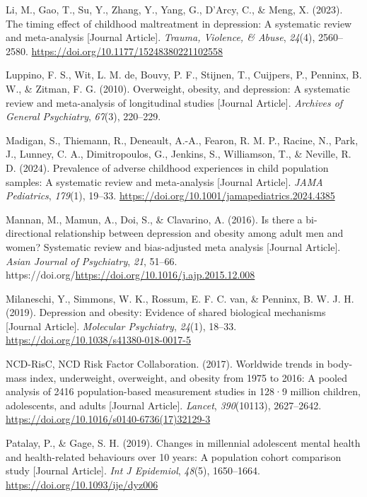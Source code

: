 \documentclass[
  letterpaper,
  DIV=11,
  numbers=noendperiod]{scrreport}
\newlength{\cslhangindent}
\newenvironment{CSLReferences}[2] %
 {\begin{list}{}{%
  \setlength{\itemindent}{0pt}
  \setlength{\leftmargin}{0pt}
  \setlength{\parsep}{0pt}
  \ifodd #1
   \setlength{\leftmargin}{\cslhangindent}
   \setlength{\itemindent}{-1\cslhangindent}
  \fi
  \setlength{\itemsep}{#2\baselineskip}}}
 {\end{list}}
\begin{document}
\begin{CSLReferences}{1}{0}
Li, M., Gao, T., Su, Y., Zhang, Y., Yang, G., D'Arcy, C., \& Meng, X.
(2023). The timing effect of childhood maltreatment in depression: A
systematic review and meta-analysis {[}Journal Article{]}. \emph{Trauma,
Violence, \& Abuse}, \emph{24}(4), 2560--2580.
\url{https://doi.org/10.1177/15248380221102558}

Luppino, F. S., Wit, L. M. de, Bouvy, P. F., Stijnen, T., Cuijpers, P.,
Penninx, B. W., \& Zitman, F. G. (2010). Overweight, obesity, and
depression: A systematic review and meta-analysis of longitudinal
studies {[}Journal Article{]}. \emph{Archives of General Psychiatry},
\emph{67}(3), 220--229.

Madigan, S., Thiemann, R., Deneault, A.-A., Fearon, R. M. P., Racine,
N., Park, J., Lunney, C. A., Dimitropoulos, G., Jenkins, S., Williamson,
T., \& Neville, R. D. (2024). Prevalence of adverse childhood
experiences in child population samples: A systematic review and
meta-analysis {[}Journal Article{]}. \emph{JAMA Pediatrics},
\emph{179}(1), 19--33.
\url{https://doi.org/10.1001/jamapediatrics.2024.4385}

Mannan, M., Mamun, A., Doi, S., \& Clavarino, A. (2016). Is there a
bi-directional relationship between depression and obesity among adult
men and women? Systematic review and bias-adjusted meta analysis
{[}Journal Article{]}. \emph{Asian Journal of Psychiatry}, \emph{21},
51--66. https://doi.org/\url{https://doi.org/10.1016/j.ajp.2015.12.008}

Milaneschi, Y., Simmons, W. K., Rossum, E. F. C. van, \& Penninx, B. W.
J. H. (2019). Depression and obesity: Evidence of shared biological
mechanisms {[}Journal Article{]}. \emph{Molecular Psychiatry},
\emph{24}(1), 18--33. \url{https://doi.org/10.1038/s41380-018-0017-5}

NCD-RisC, NCD Risk Factor Collaboration. (2017). Worldwide trends in
body-mass index, underweight, overweight, and obesity from 1975 to 2016:
A pooled analysis of 2416 population-based measurement studies in 128·9
million children, adolescents, and adults {[}Journal Article{]}.
\emph{Lancet}, \emph{390}(10113), 2627--2642.
\url{https://doi.org/10.1016/s0140-6736(17)32129-3}

Patalay, P., \& Gage, S. H. (2019). Changes in millennial adolescent
mental health and health-related behaviours over 10 years: A population
cohort comparison study {[}Journal Article{]}. \emph{Int J Epidemiol},
\emph{48}(5), 1650--1664. \url{https://doi.org/10.1093/ije/dyz006}


\end{CSLReferences}
\end{document}
